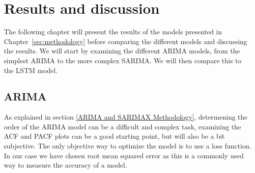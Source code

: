 \section{Results and discussion}\label{sec:results}
The following chapter will present the results of the models presented in Chapter~\ref{sec:methodology} before comparing the different models and discussing the results. We will start by examining the different ARIMA models, from the simplest ARIMA to the more complex SARIMA. We will then compare this to the LSTM model. 

\subsection{ARIMA}\label{sec:arima}
As explained in section \ref{ARIMA and SARIMAX Methodology}, determening the order of the ARIMA model can be a difficult and complex task, examining the ACF and PACF plots can be a good starting point, but will also be a bit subjective. The only objective way to optimize the model is to use a loss function. In our case we have chosen root mean squared error as this is a commonly used way to measure the accuracy of a model.

